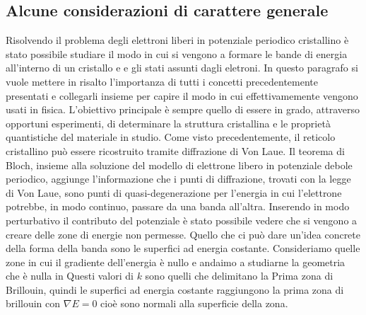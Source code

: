 \documentclass[a4paper,12pt]{article}
\begin{document}
\subsection{Alcune considerazioni di carattere generale}
Risolvendo il problema degli elettroni liberi in potenziale periodico cristallino è stato possibile studiare il modo in cui si vengono a formare le bande di energia all'interno di un cristallo e e gli stati assunti dagli eletroni. In questo paragrafo si vuole mettere in risalto l'importanza di tutti i concetti precedentemente presentati e collegarli insieme per capire il modo in cui effettivamemente vengono usati in fisica. L'obiettivo principale è sempre quello di essere in grado, attraverso opportuni esperimenti, di determinare la struttura cristallina e le proprietà quantistiche del materiale in studio. Come visto precedentemente, il reticolo cristallino può essere ricostruito tramite diffrazione di Von Laue. Il teorema di Bloch, insieme alla soluzione del modello di elettrone libero in potenziale debole periodico, aggiunge l'informazione che i punti di diffrazione, trovati con la legge di Von Laue, sono punti di quasi-degenerazione per l'energia in cui l'elettrone potrebbe, in modo continuo, passare da una banda all'altra. Inserendo in modo perturbativo il contributo del potenziale è stato possibile vedere che si vengono a creare delle zone di energie non permesse. Quello che ci può dare un'idea concrete della forma della banda sono le superfici ad energia costante. Consideriamo quelle zone in cui il gradiente dell'energia è nullo e andaimo a studiarne la geometria
che è nulla in 
Questi valori di $k$ sono quelli che delimitano la Prima zona di Brillouin, quindi le superfici ad energia costante raggiungono la prima zona di brillouin con $\nabla E =0$ cioè sono normali alla superficie della zona.
\end{document}
